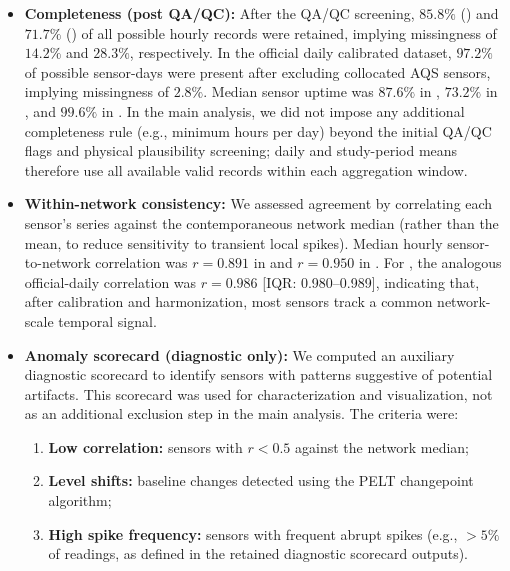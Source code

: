 \begin{itemize}
 \item \textbf{Completeness (post QA/QC):} After the QA/QC screening, $85.8\%$ () and $71.7\%$ () of all possible hourly records were retained, implying missingness of $14.2\%$ and $28.3\%$, respectively. In the  official daily calibrated dataset, $97.2\%$ of possible sensor-days were present after excluding collocated AQS sensors, implying missingness of $2.8\%$. Median sensor uptime was $87.6\%$ in , $73.2\%$ in , and $99.6\%$ in . In the main analysis, we did not impose any additional completeness rule (e.g., minimum hours per day) beyond the initial QA/QC flags and physical plausibility screening; daily and study-period means therefore use all available valid records within each aggregation window.

 \item \textbf{Within-network consistency:} We assessed agreement by correlating each sensor's series against the contemporaneous network median (rather than the mean, to reduce sensitivity to transient local spikes). Median hourly sensor-to-network correlation was $r=0.891$ in  and $r=0.950$ in . For , the analogous official-daily correlation was $r=0.986$ [IQR: 0.980--0.989], indicating that, after calibration and harmonization, most sensors track a common network-scale temporal signal.

 \item \textbf{Anomaly scorecard (diagnostic only):} We computed an auxiliary diagnostic scorecard to identify sensors with patterns suggestive of potential artifacts. This scorecard was used for characterization and visualization, not as an additional exclusion step in the main analysis. The criteria were:
 \begin{enumerate}
 \item \textbf{Low correlation:} sensors with $r < 0.5$ against the network median;
 \item \textbf{Level shifts:} baseline changes detected using the PELT changepoint algorithm;
 \item \textbf{High spike frequency:} sensors with frequent abrupt spikes (e.g., $>5\%$ of readings, as defined in the retained diagnostic scorecard outputs).
 \end{enumerate}
\end{itemize}

